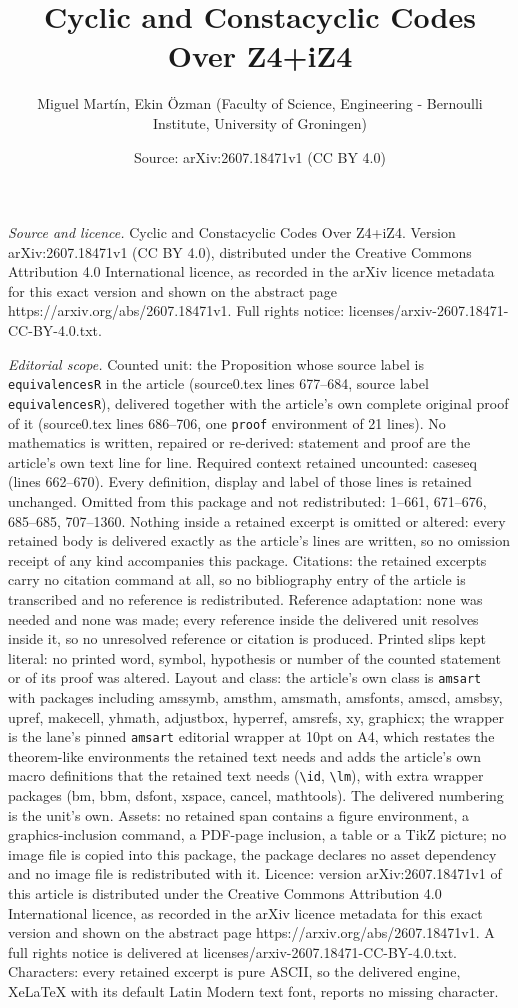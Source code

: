 \documentclass[10pt,a4paper]{amsart}
\title[Cyclic and Constacyclic Codes Over Z4+iZ4]{Cyclic and Constacyclic Codes Over Z4+iZ4}
\author{Miguel Mart\'in, Ekin \"Ozman (Faculty of Science, Engineering - Bernoulli Institute, University of Groningen)}
\date{Source: arXiv:2607.18471v1 (CC BY 4.0)}
\begin{document}
\maketitle

\noindent\emph{Source and licence.} Cyclic and Constacyclic Codes Over Z4+iZ4. Version arXiv:2607.18471v1 (CC BY 4.0), distributed under the Creative Commons Attribution 4.0 International licence, as recorded in the arXiv licence metadata for this exact version and shown on the abstract page https://arxiv.org/abs/2607.18471v1. Full rights notice: licenses/arxiv-2607.18471-CC-BY-4.0.txt.\par\smallskip

\noindent\textit{Editorial scope.} Counted unit: the Proposition whose source label is \texttt{equivalencesR} in the article (source0.tex lines 677--684, source label \texttt{equivalencesR}), delivered together with the article's own complete original proof of it (source0.tex lines 686--706, one \texttt{proof} environment of 21 lines). No mathematics is written, repaired or re-derived: statement and proof are the article's own text line for line. Required context retained uncounted: caseseq (lines 662--670). Every definition, display and label of those lines is retained unchanged. Omitted from this package and not redistributed: 1--661, 671--676, 685--685, 707--1360. Nothing inside a retained excerpt is omitted or altered: every retained body is delivered exactly as the article's lines are written, so no omission receipt of any kind accompanies this package. Citations: the retained excerpts carry no citation command at all, so no bibliography entry of the article is transcribed and no reference is redistributed. Reference adaptation: none was needed and none was made; every reference inside the delivered unit resolves inside it, so no unresolved reference or citation is produced. Printed slips kept literal: no printed word, symbol, hypothesis or number of the counted statement or of its proof was altered. Layout and class: the article's own class is \texttt{amsart} with packages including amssymb, amsthm, amsmath, amsfonts, amscd, amsbsy, upref, makecell, yhmath, adjustbox, hyperref, amsrefs, xy, graphicx; the wrapper is the lane's pinned \texttt{amsart} editorial wrapper at 10pt on A4, which restates the theorem-like environments the retained text needs and adds the article's own macro definitions that the retained text needs (\texttt{\textbackslash id}, \texttt{\textbackslash lm}), with extra wrapper packages (bm, bbm, dsfont, xspace, cancel, mathtools). The delivered numbering is the unit's own. Assets: no retained span contains a figure environment, a graphics-inclusion command, a PDF-page inclusion, a table or a TikZ picture; no image file is copied into this package, the package declares no asset dependency and no image file is redistributed with it. Licence: version arXiv:2607.18471v1 of this article is distributed under the Creative Commons Attribution 4.0 International licence, as recorded in the arXiv licence metadata for this exact version and shown on the abstract page https://arxiv.org/abs/2607.18471v1. A full rights notice is delivered at licenses/arxiv-2607.18471-CC-BY-4.0.txt. Characters: every retained excerpt is pure ASCII, so the delivered engine, XeLaTeX with its default Latin Modern text font, reports no missing character.
\end{document}
